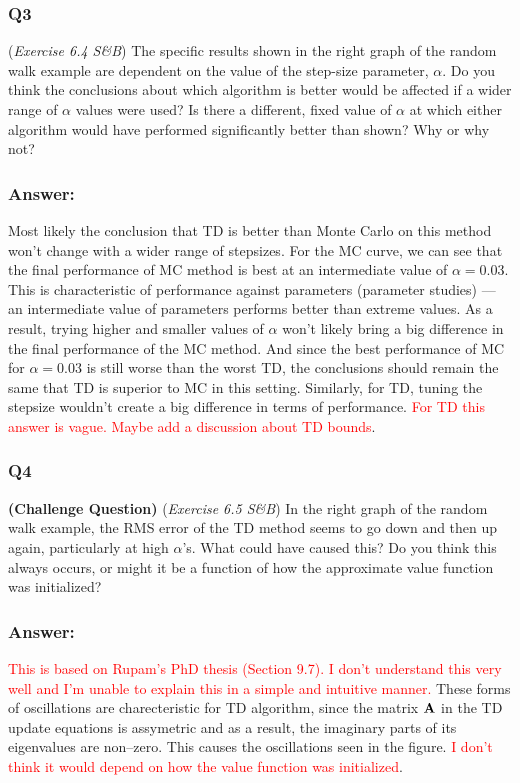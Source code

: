 \documentclass[a4paper, 10pt]{article}
\begin{document}
\subsubsection*{Q3}
(\textit{Exercise 6.4 S\&B})
The specific results shown in the right graph of the random walk example are dependent on the value of the step-size parameter, $\alpha$.
Do you think the conclusions about which algorithm is better would be affected if a wider range of $\alpha$ values were used?
Is there a different, fixed value of $\alpha$ at which either algorithm would have performed significantly better than shown? Why or why not?

\subsubsection*{Answer:}
Most likely the conclusion that TD is better than Monte Carlo on this method won't change with a wider range of stepsizes. For the MC curve, we can see that the final performance of MC method is best at an intermediate value of $\alpha=0.03$. This is characteristic of performance against parameters (parameter studies) --- an intermediate value of parameters performs better than extreme values. As a result, trying higher and smaller values of $\alpha$ won't likely bring a big difference in the final performance of the MC method. And since the best performance of MC for $\alpha=0.03$ is still worse than the worst TD, the conclusions should remain the same that TD is superior to MC in this setting. Similarly, for TD, tuning the stepsize wouldn't create a big difference in terms of performance. \textcolor{red}{For TD this answer is vague. Maybe add a discussion about TD bounds}.

\subsubsection*{Q4}
\textbf{(Challenge Question)} (\textit{Exercise 6.5 S\&B}) In the right graph of the random walk example, the RMS error of the
TD method seems to go down and then up again, particularly at high $\alpha$'s.
What could have caused this?
Do you think this always occurs, or might it be a function of how the approximate value function was initialized?

\subsubsection*{Answer:}
\textcolor{red}{This is based on Rupam's PhD thesis (Section 9.7). I don't understand this very well and I'm unable to explain this in a simple and intuitive manner.} These forms of oscillations are charecteristic for TD algorithm, since the matrix ${\bf A}$ in the TD update equations is assymetric and as a result, the imaginary parts of its eigenvalues are non--zero. This causes the oscillations seen in the figure. \textcolor{red}{I don't think it would depend on how the value function was initialized}.
\end{document}

